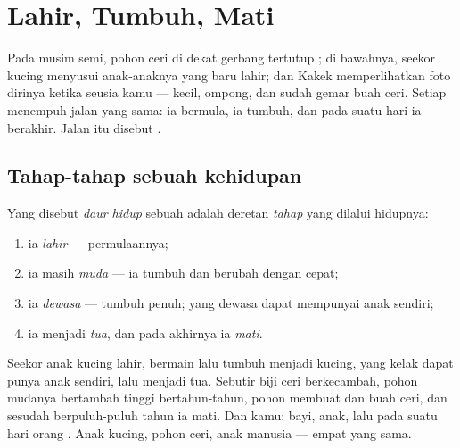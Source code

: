 \chapter{Lahir, Tumbuh, Mati}\label{ch:g2:born-grow-die}

Pada musim semi, pohon ceri di dekat gerbang tertutup ; di
bawahnya, seekor kucing menyusui anak-anaknya yang baru lahir; dan
Kakek memperlihatkan foto dirinya ketika seusia kamu --- kecil, ompong,
dan sudah gemar buah ceri. Setiap  menempuh jalan yang
sama: ia bermula, ia tumbuh, dan pada suatu hari ia berakhir. Jalan
itu disebut .

\section{Tahap-tahap sebuah kehidupan}

\begin{definition}\label{def:g2:born-grow-die:cycle}
Yang disebut \emph{daur hidup} sebuah 
adalah deretan \emph{tahap} yang dilalui hidupnya:
\begin{enumerate}
  \item ia \emph{lahir} --- permulaannya;
  \item ia masih \emph{muda} --- ia tumbuh dan berubah
        dengan cepat;
  \item ia \emph{dewasa} --- tumbuh penuh; yang dewasa
        dapat mempunyai anak sendiri;
  \item ia menjadi \emph{tua}, dan pada akhirnya ia
        \emph{mati}.
\end{enumerate}
\end{definition}

\begin{example}\label{ex:g2:born-grow-die:three}
Seekor anak kucing lahir, bermain lalu tumbuh menjadi kucing, yang
kelak dapat punya anak sendiri, lalu menjadi tua. Sebutir biji ceri
berkecambah, pohon mudanya bertambah tinggi bertahun-tahun, pohon
 membuat  dan buah ceri, dan sesudah berpuluh-puluh
tahun ia mati. Dan kamu: bayi, anak, lalu pada suatu hari orang
. Anak kucing, pohon ceri, anak manusia --- empat  yang
sama.
\end{example}

